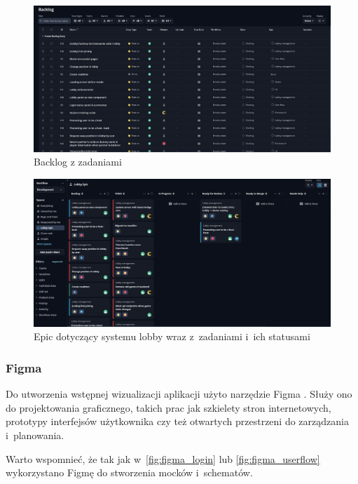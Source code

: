 \begin{figure}[h!]
  \centering
  \includegraphics[width=\textwidth]{img/shortcut/shortcut_backlog.png}
  \caption{Backlog z zadaniami}
\end{figure}

\begin{figure}[h!]
  \centering
  \includegraphics[width=\textwidth]{img/shortcut/shortcut_epic.png}
  \caption{Epic dotyczący systemu lobby wraz z~zadaniami i~ich statusami}
\end{figure}

\FloatBarrier


\subsubsection{Figma}

Do utworzenia wstępnej wizualizacji aplikacji użyto narzędzie Figma \cite{Figma}.
Służy ono do projektowania graficznego, takich prac jak szkielety stron
internetowych, prototypy interfejsów użytkownika czy też otwartych przestrzeni
do zarządzania i~planowania.

Warto wspomnieć, że tak jak w~\ref{fig:figma_login} lub
\ref{fig:figma_userflow} wykorzystano Figmę do stworzenia mocków i~schematów.


